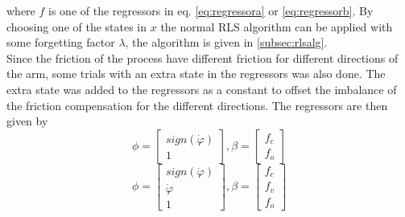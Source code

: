 \documentclass[10pt,a4paper]{article}
\begin{document}
where $f$ is one of the regressors in eq. \ref{eq:regressora} or \ref{eq:regressorb}. By choosing one of the states in $x$ the normal RLS algorithm can be applied with some forgetting factor $\lambda$, the algorithm is given in \ref{subsec:rlsalg}.
\\
Since the friction of the process have different friction for different directions of the arm, some trials with an extra state in the regressors was also done. The extra state was added to the regressors as a constant to offset the imbalance of the friction compensation for the different directions. The regressors are then given by 
\begin{equation}
\phi=\begin{bmatrix}
sign(\dot{\varphi}) \\
1
\end{bmatrix}, \beta = \begin{bmatrix}
f_c\\
f_o
\end{bmatrix}
\label{eq:regressorao}
\end{equation}
\begin{equation}
\phi=\begin{bmatrix}
sign(\dot{\varphi}) \\
\dot{\varphi} \\
1
\end{bmatrix}, \beta = \begin{bmatrix}
f_c\\
f_v\\
f_o
\end{bmatrix}
\label{eq:regressorbo}
\end{equation} 


\end{document}
